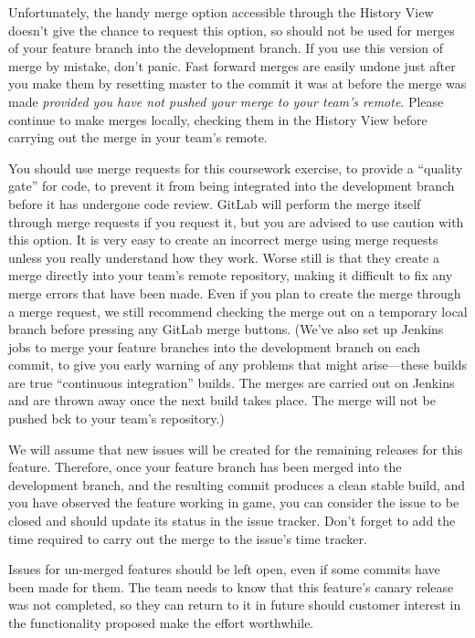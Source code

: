 \documentclass[
]{book}
\begin{document}
Unfortunately, the handy merge option accessible through the History View doesn't give the chance to request this option, so should not be used for merges of your feature branch into the development branch. If you use this version of merge by mistake, don't panic. Fast forward merges are easily undone just after you make them by resetting master to the commit it was at before the merge was made \emph{provided you have not pushed your merge to your team's remote}. Please continue to make merges locally, checking them in the History View before carrying out the merge in your team's remote.

You should use merge requests for this coursework exercise, to provide a ``quality gate'' for code, to prevent it from being integrated into the development branch before it has undergone code review. GitLab will perform the merge itself through merge requests if you request it, but you are advised to use caution with this option. It is very easy to create an incorrect merge using merge requests unless you really understand how they work. Worse still is that they create a merge directly into your team's remote repository, making it difficult to fix any merge errors that have been made. Even if you plan to create the merge through a merge request, we still recommend checking the merge out on a temporary local branch before pressing any GitLab merge buttons. (We've also set up Jenkins jobs to merge your feature branches into the development branch on each commit, to give you early warning of any problems that might arise---these builds are true ``continuous integration'' builds. The merges are carried out on Jenkins and are thrown away once the next build takes place. The merge will not be pushed bck to your team's repository.)

We will assume that new issues will be created for the remaining releases for this feature. Therefore, once your feature branch has been merged into the development branch, and the resulting commit produces a clean stable build, and you have observed the feature working in game, you can consider the issue to be closed and should update its status in the issue tracker. Don't forget to add the time required to carry out the merge to the issue's time tracker.

Issues for un-merged features should be left open, even if some commits have been made for them. The team needs to know that this feature's canary release was not completed, so they can return to it in future should customer interest in the functionality proposed make the effort worthwhile.
\end{document}
